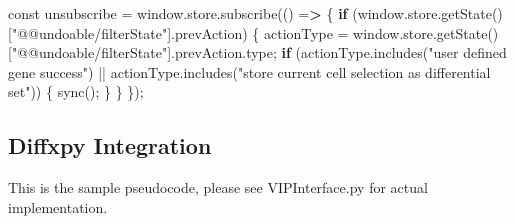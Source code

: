\documentclass[
]{article}
\newenvironment{Shaded}{\begin{snugshade}}{\end{snugshade}}
\newcommand{\ControlFlowTok}[1]{\textcolor[rgb]{0.13,0.29,0.53}{\textbf{#1}}}
\newcommand{\ErrorTok}[1]{\textcolor[rgb]{0.64,0.00,0.00}{\textbf{#1}}}
\newcommand{\FunctionTok}[1]{\textcolor[rgb]{0.00,0.00,0.00}{#1}}
\newcommand{\NormalTok}[1]{#1}
\newcommand{\OtherTok}[1]{\textcolor[rgb]{0.56,0.35,0.01}{#1}}
\newcommand{\SpecialCharTok}[1]{\textcolor[rgb]{0.00,0.00,0.00}{#1}}
\newcommand{\StringTok}[1]{\textcolor[rgb]{0.31,0.60,0.02}{#1}}
\begin{document}
\begin{Shaded}
\begin{Highlighting}[]
\NormalTok{const unsubscribe }\OtherTok{=} \FunctionTok{window.store.subscribe}\NormalTok{(() }\OtherTok{=}\ErrorTok{\textgreater{}}\NormalTok{ \{}
  \ControlFlowTok{if}\NormalTok{ (}\FunctionTok{window.store.getState}\NormalTok{()[}\StringTok{"@@undoable/filterState"}\NormalTok{].prevAction) \{}
\NormalTok{    actionType }\OtherTok{=} \FunctionTok{window.store.getState}\NormalTok{()[}\StringTok{"@@undoable/filterState"}\NormalTok{].prevAction.type;}
    \ControlFlowTok{if}\NormalTok{ (}\FunctionTok{actionType.includes}\NormalTok{(}\StringTok{"user defined gene success"}\NormalTok{) }\SpecialCharTok{||}
    \FunctionTok{actionType.includes}\NormalTok{(}\StringTok{"store current cell selection as differential set"}\NormalTok{)) \{}
      \FunctionTok{sync}\NormalTok{();}
\NormalTok{      \}}
\NormalTok{  \}}
\NormalTok{\});}
\end{Highlighting}
\end{Shaded}

\hypertarget{diffxpy-integration}{%
\subsection*{Diffxpy Integration}\label{diffxpy-integration}}

This is the sample pseudocode, please see VIPInterface.py for actual implementation.
\end{document}
